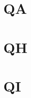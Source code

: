 \documentclass[my_thesis.tex]{subfiles}
\begin{document}



\section{QA}

\section{QH}

\section{QI}
\end{document}
